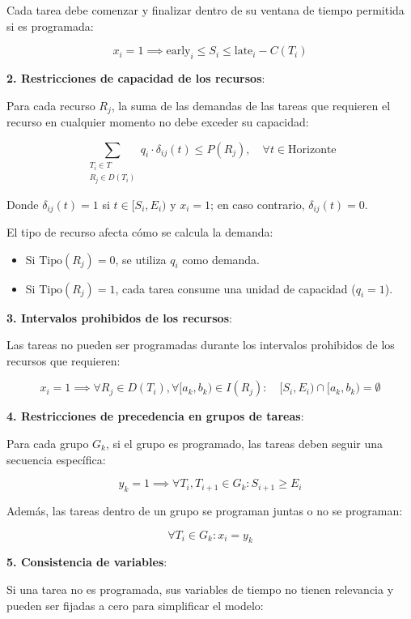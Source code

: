 \documentclass{article}
\begin{document}
Cada tarea debe comenzar y finalizar dentro de su ventana de tiempo permitida si es programada:

\[
x_i = 1 \implies \text{early}_i \leq S_i \leq \text{late}_i - C(T_i)
\]

\textbf{2. Restricciones de capacidad de los recursos}:

Para cada recurso \( R_j \), la suma de las demandas de las tareas que requieren el recurso en cualquier momento no debe exceder su capacidad:

\[
\sum_{\substack{T_i \in T \\ R_j \in D(T_i)}} q_i \cdot \delta_{ij}(t) \leq P(R_j), \quad \forall t \in \text{Horizonte}
\]

Donde \( \delta_{ij}(t) = 1 \) si \( t \in [S_i, E_i) \) y \( x_i = 1 \); en caso contrario, \( \delta_{ij}(t) = 0 \).

El tipo de recurso afecta cómo se calcula la demanda:

\begin{itemize}
    \item Si \( \text{Tipo}(R_j) = 0 \), se utiliza \( q_i \) como demanda.
    \item Si \( \text{Tipo}(R_j) = 1 \), cada tarea consume una unidad de capacidad (\( q_i = 1 \)).
\end{itemize}

\textbf{3. Intervalos prohibidos de los recursos}:

Las tareas no pueden ser programadas durante los intervalos prohibidos de los recursos que requieren:

\[
x_i = 1 \implies \forall R_j \in D(T_i), \forall [a_k, b_k) \in I(R_j): \quad [S_i, E_i) \cap [a_k, b_k) = \emptyset
\]

\textbf{4. Restricciones de precedencia en grupos de tareas}:

Para cada grupo \( G_k \), si el grupo es programado, las tareas deben seguir una secuencia específica:

\[
y_k = 1 \implies \forall T_i, T_{i+1} \in G_k: S_{i+1} \geq E_i
\]

Además, las tareas dentro de un grupo se programan juntas o no se programan:

\[
\forall T_i \in G_k: x_i = y_k
\]

\textbf{5. Consistencia de variables}:

Si una tarea no es programada, sus variables de tiempo no tienen relevancia y pueden ser fijadas a cero para simplificar el modelo:
\end{document}
